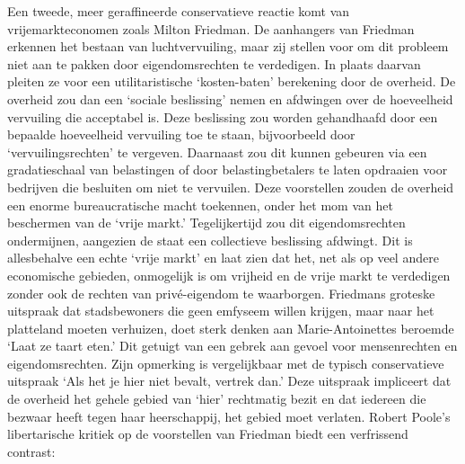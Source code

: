 \documentclass[
  a5paper,
  smalldemyvopaper,10pt,twoside,onecolumn,openright,extrafontsizes,hidelinks]{memoir}
\begin{document}
Een tweede, meer geraffineerde conservatieve reactie komt van
vrijemarkteconomen zoals Milton Friedman. De aanhangers van Friedman
erkennen het bestaan van luchtvervuiling, maar zij stellen voor om dit
probleem niet aan te pakken door eigendomsrechten te verdedigen. In
plaats daarvan pleiten ze voor een utilitaristische `kosten-baten'
berekening door de overheid. De overheid zou dan een `sociale
beslissing' nemen en afdwingen over de hoeveelheid vervuiling die
acceptabel is. Deze beslissing zou worden gehandhaafd door een bepaalde
hoeveelheid vervuiling toe te staan, bijvoorbeeld door
`vervuilingsrechten' te vergeven. Daarnaast zou dit kunnen gebeuren via
een gradatieschaal van belastingen of door belastingbetalers te laten
opdraaien voor bedrijven die besluiten om niet te vervuilen. Deze
voorstellen zouden de overheid een enorme bureaucratische macht
toekennen, onder het mom van het beschermen van de `vrije markt.'
Tegelijkertijd zou dit eigendomsrechten ondermijnen, aangezien de staat
een collectieve beslissing afdwingt. Dit is allesbehalve een echte
`vrije markt' en laat zien dat het, net als op veel andere economische
gebieden, onmogelijk is om vrijheid en de vrije markt te verdedigen
zonder ook de rechten van privé-eigendom te waarborgen. Friedmans
groteske uitspraak dat stadsbewoners die geen emfyseem willen krijgen,
maar naar het platteland moeten verhuizen, doet sterk denken aan
Marie-Antoinettes beroemde `Laat ze taart eten.' Dit getuigt van een
gebrek aan gevoel voor mensenrechten en eigendomsrechten. Zijn opmerking
is vergelijkbaar met de typisch conservatieve uitspraak `Als het je hier
niet bevalt, vertrek dan.' Deze uitspraak impliceert dat de overheid het
gehele gebied van `hier' rechtmatig bezit en dat iedereen die bezwaar
heeft tegen haar heerschappij, het gebied moet verlaten. Robert Poole's
libertarische kritiek op de voorstellen van Friedman biedt een
verfrissend contrast:
\end{document}
